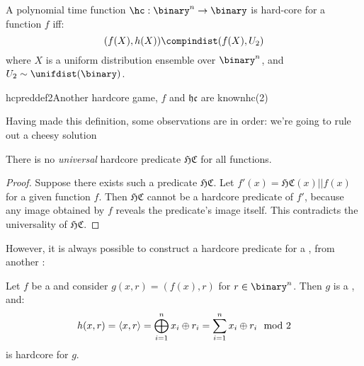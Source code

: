 \begin{definition}
    A polynomial time function $\hc : \binary^n \to \binary$ is hard-core for a function $f$ iff:
    \[
        (f(X), h(X)) \compindist (f(X), U_2)
    \]
    where $X$ is a uniform distribution ensemble over $\binary^n$, and $U_2 \sim \unifdist(\binary)$.
\end{definition}


\begin{cryptogame}{hcpreddef2}{Another hardcore game, $f$ and $\mathfrak{hc}$ are known}{hc(2)}
    \cseqdelay

    \cseqdelay
    \cseqdelay

\end{cryptogame}


Having made this definition, some observations are in order: we're going to rule out a cheesy solution

\begin{claim}
    There is no \textit{universal} hardcore predicate $\mathfrak{HC}$ for all functions.
\end{claim}

\begin{proof}
    Suppose there exists such a predicate $\mathfrak{HC}$. Let $f'(x) = \mathfrak{HC}(x) || f(x)$ for a given function $f$. Then $\mathfrak{HC}$ cannot be a hardcore predicate of $f'$, because any image obtained by $f$ reveals the predicate's image itself. This contradicts the universality of $\mathfrak{HC}$.
\end{proof}

However, it is always possible to construct a hardcore predicate for a \owf{}, from another \owf:

\begin{theorem}
    Let $f$ be a \owf{} and consider $g(x, r) = (f(x), r)$ for $r \in \binary^n$. Then $g$ is a \owf{}, and:
    \[
        h(x,r) = \left<x, r\right> = \bigoplus_{i = 1}^n x_i \oplus r_i = \sum_{i = 1}^n x_i \oplus r_i \mod 2
    \]
    is hardcore for $g$.
\end{theorem}

